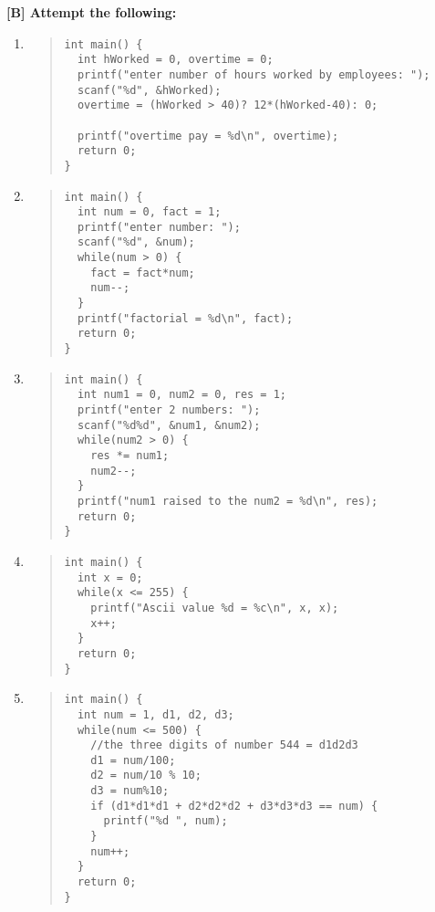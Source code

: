 \documentclass{report}
\begin{document}
\textbf{[B] Attempt the following:}
\begin{enumerate}
    \renewcommand{\labelenumi}{\alph{enumi}}
  \item \begin{quote} \begin{verbatim}
int main() {
  int hWorked = 0, overtime = 0;
  printf("enter number of hours worked by employees: ");
  scanf("%d", &hWorked);
  overtime = (hWorked > 40)? 12*(hWorked-40): 0;

  printf("overtime pay = %d\n", overtime);
  return 0;
}
  \end{verbatim} \end{quote}

  \item \begin{quote} \begin{verbatim}
int main() {
  int num = 0, fact = 1;
  printf("enter number: ");
  scanf("%d", &num);
  while(num > 0) {
    fact = fact*num;
    num--;
  }
  printf("factorial = %d\n", fact);
  return 0;
}
  \end{verbatim} \end{quote}

  \item \begin{quote} \begin{verbatim}
int main() {
  int num1 = 0, num2 = 0, res = 1;
  printf("enter 2 numbers: ");
  scanf("%d%d", &num1, &num2);
  while(num2 > 0) {
    res *= num1;
    num2--;
  }
  printf("num1 raised to the num2 = %d\n", res);
  return 0;
}
  \end{verbatim} \end{quote}

  \item \begin{quote} \begin{verbatim}
int main() {
  int x = 0;
  while(x <= 255) {
    printf("Ascii value %d = %c\n", x, x);
    x++;
  }
  return 0;
}
  \end{verbatim} \end{quote}

  \item \begin{quote} \begin{verbatim}
int main() {
  int num = 1, d1, d2, d3;
  while(num <= 500) {
    //the three digits of number 544 = d1d2d3
    d1 = num/100;
    d2 = num/10 % 10;
    d3 = num%10;
    if (d1*d1*d1 + d2*d2*d2 + d3*d3*d3 == num) {
      printf("%d ", num);
    }
    num++;
  }
  return 0;
}
  \end{verbatim} \end{quote}


\end{enumerate}
\end{document}

